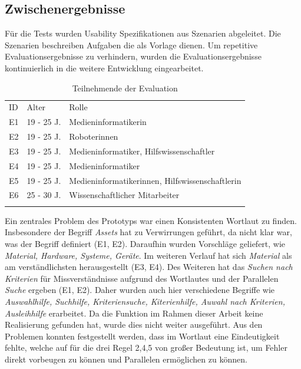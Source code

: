 \subsection{Zwischenergebnisse}
Für die Tests wurden Usability Spezifikationen aus Szenarien abgeleitet. Die Szenarien beschreiben
Aufgaben die als Vorlage dienen. Um repetitive Evaluationsergebnisse zu verhindern, wurden die
Evaluationsergebnisse kontinuierlich in die weitere Entwicklung eingearbeitet.

\begin{table}[h]
    \centering
    \caption{Teilnehmende der Evaluation}
    \begin{tabular}{lll}
            \arrayrulecolor{maincolor}\hline
            \sffamily\color{maincolor}ID & \sffamily\color{maincolor}Alter &
            \sffamily\color{maincolor}Rolle \\
            \arrayrulecolor{maincolor}\hline
            E1                           & 19 - 25 J.                      &
            Medieninformatikerin                     \\
            E2                           & 19 - 25 J.                      & Roboterinnen \\
            E3                           & 19 - 25 J.                      & Medieninformatiker, Hilfswissenschaftler        \\
            E4                          & 19 - 25 J.                      & Medieninformatiker \\
            E5                           & 19 - 25 J.                      &
            Medieninformatikerinnen, Hilfswissenschaftlerin \\
            E6                           & 25 - 30 J.                      & Wissenschaftlicher Mitarbeiter        \\
            \arrayrulecolor{maincolor}\hline
    \end{tabular}
    \label{table:e}
\end{table}

Ein zentrales Problem des Prototyps war einen Konsistenten Wortlaut zu finden. Insbesondere der
Begriff \textit{Assets} hat zu Verwirrungen geführt, da nicht klar war, was der Begriff definiert
(E1, E2). Daraufhin wurden Vorschläge geliefert, wie \textit{Material, Hardware, Systeme, Geräte}. Im
weiteren Verlauf hat sich \textit{Material} als am verständlichsten herausgestellt (E3, E4). Des
Weiteren hat das \textit{Suchen nach Kriterien} für Missverständnisse aufgrund des Wortlautes und
der Parallelen \textit{Suche} ergeben (E1, E2). Daher wurden auch hier verschiedene Begriffe wie
\textit{Auswahlhilfe, Suchhilfe, Kriteriensuche, Kiterienhilfe, Auwahl nach Kriterien, Ausleihhilfe}
erarbeitet. Da die Funktion im Rahmen dieser Arbeit keine Realisierung gefunden hat, wurde dies nicht
weiter ausgeführt. Aus den Problemen konnten festgestellt werden, dass im Wortlaut eine
Eindeutigkeit fehlte, welche auf für die drei Regel 2,4,5 von großer Bedeutung ist, um Fehler direkt
vorbeugen zu können und Parallelen ermöglichen zu können.


